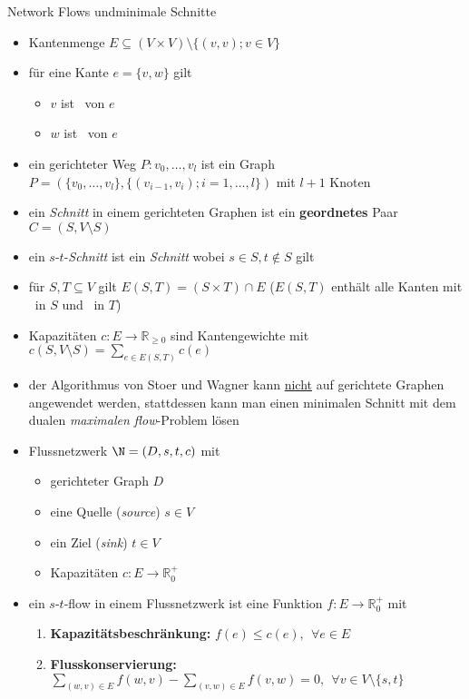 \begin{TOPbreak}{Network Flows und}{minimale Schnitte}
	\up\up\begin{itemize}
		\item Kantenmenge $E \subseteq (V \times V)\setminus \{(v,v);v \in V\}$
		\item für eine Kante $e=\{v,w\}$ gilt
			\begin{itemize}
				\item $v$ ist \tail~von $e$
				\item $w$ ist \head~von $e$
			\end{itemize}
		\item ein gerichteter Weg $P:v_0,\dots,v_l$ ist ein Graph $P=(\{v_0,\dots,v_l\},\{(v_{i-1},v_i);i=1,\dots,l\})$ mit $l+1$ Knoten
		\item ein \textit{Schnitt} in einem gerichteten Graphen ist ein \textbf{geordnetes} Paar $C=(S,V\setminus S)$
		\item ein $s$-$t$-\textit{Schnitt} ist ein \textit{Schnitt} wobei $s\in S, t\notin S$ gilt
		\item für $S,T\subseteq V$ gilt $E(S,T) = (S \times T) \cap E$ ($E(S,T)$ enthält alle Kanten mit \tail~in $S$ und \head~in $T$)
		\item Kapazitäten $c:E\rightarrow \mathbb{R}_{\geq 0}$ sind Kantengewichte mit $c(S,V\setminus S) = \sum\limits_{e\in E(S,T)} c(e)$
		\item der Algorithmus von Stoer und Wagner kann \underline{nicht} auf gerichtete Graphen angewendet werden, stattdessen kann man einen minimalen Schnitt mit dem dualen \textit{maximalen flow}-Problem lösen
		\item Flussnetzwerk $\N = (D,s,t,c)$ mit
			\begin{itemize}
				\item gerichteter Graph $D$
				\item eine Quelle (\textit{source}) $s \in V$
				\item ein Ziel (\textit{sink}) $t \in V$
				\item Kapazitäten $c : E \rightarrow \mathbb{R}_0^{+}$
			\end{itemize}
		\item ein $s$-$t$-flow in einem Flussnetzwerk ist eine Funktion $f:E\rightarrow \mathbb{R}_0^{+}$ mit
			\begin{enumerate}
				\item \textbf{Kapazitätsbeschränkung:} $f(e) \leq c(e),~~\forall e \in E$
				\item \textbf{Flusskonservierung:} $\sum\limits_{(w,v) \in E} f(w,v) -\sum\limits_{(v,w) \in E} f(v,w) = 0,~~\forall v \in V\setminus \{s,t\}$

\end{enumerate}
\end{itemize}
\end{TOPbreak}
